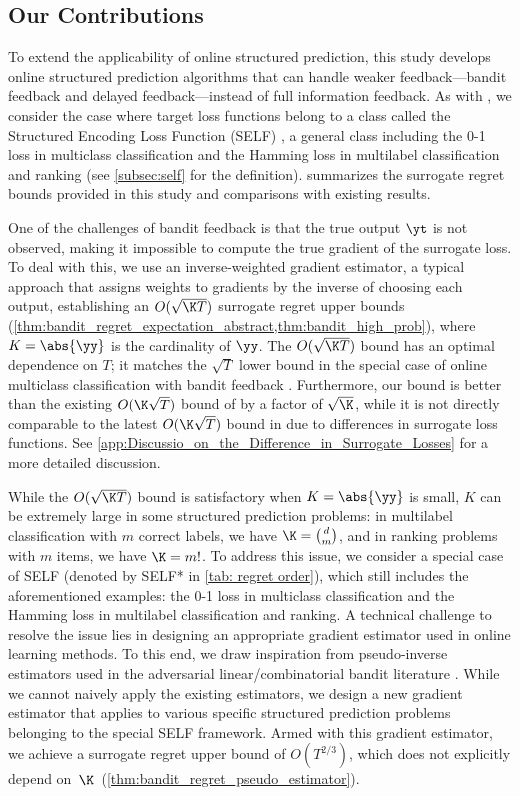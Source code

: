 \subsection*{Our Contributions}
To extend the applicability of online structured prediction, this study develops online structured prediction algorithms that can handle weaker feedback---bandit feedback and delayed feedback---instead of full information feedback.  
As with \citet{pmlr-v247-sakaue24a}, we consider the case where target loss functions belong to a class called the Structured Encoding Loss Function (SELF) \citep{ciliberto16consistent,NEURIPS2019_Blondel}, a general class including the 0-1 loss in multiclass classification and the Hamming loss in multilabel classification and ranking (see \cref{subsec:self} for the definition). 
 summarizes the surrogate regret bounds provided in this study and comparisons with existing results.


One of the challenges of bandit feedback is that the true output $\yt$ is not observed, making it impossible to compute the true gradient of the surrogate loss. 
To deal with this, we use an inverse-weighted gradient estimator, a typical approach that assigns weights to gradients by the inverse of choosing each output, establishing an $O(\sqrt{\K T})$ surrogate regret upper bounds (\cref{thm:bandit_regret_expectation_abstract,thm:bandit_high_prob}), 
where $K = \abs{\yy}$ is the cardinality of $\yy$.  
The $O(\sqrt{\K T})$ bound has an optimal dependence on $T$; it matches the $\sqrt{T}$ lower bound in the special case of online multiclass classification with bandit feedback . 
Furthermore, our bound is better than the existing $O(\K\sqrt{T})$ bound of  by a factor of $\sqrt{\K}$, while it is not directly comparable to the latest $O(\K\sqrt{T})$ bound in  due to differences in surrogate loss functions. 
See \cref{app:Discussio_on_the_Difference_in_Surrogate_Losses} for a more detailed discussion. 

While the $O(\sqrt{\K T})$ bound is satisfactory when $K = \abs{\yy}$ is small, $K$ can be extremely large in some structured prediction problems: in multilabel classification with $m$ correct labels, we have $\K=\binom{d}{m}$, and in ranking problems with $m$ items, we have $\K=m!$.
%
To address this issue, we consider a special case of SELF (denoted by SELF* in \cref{tab: regret order}), which still includes the aforementioned examples: the 0-1 loss in multiclass classification and the Hamming loss in multilabel classification and ranking. 
A technical challenge to resolve the issue lies in designing an appropriate gradient estimator used in online learning methods.
To this end, we draw inspiration from pseudo-inverse estimators used in the adversarial linear/combinatorial bandit literature \citep{dani07price,abernethy08competing,comband}. 
While we cannot naively apply the existing estimators, we design a new gradient estimator that applies to various specific structured prediction problems belonging to the special SELF framework.
Armed with this gradient estimator, we achieve a surrogate regret upper bound of $O(T^{2/3})$, which does not explicitly depend on~$\K$~(\cref{thm:bandit_regret_pseudo_estimator}).

